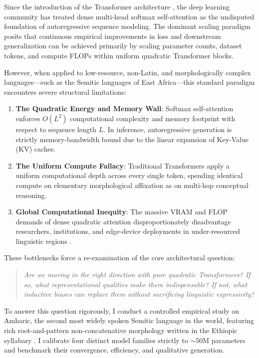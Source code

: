 \documentclass[11pt,a4paper]{article}
\begin{document}
Since the introduction of the Transformer architecture \cite{vaswani2017attention}, the deep learning community has treated dense multi-head softmax self-attention as the undisputed foundation of autoregressive sequence modeling. The dominant scaling paradigm \cite{kaplan2020scaling} posits that continuous empirical improvements in loss and downstream generalization can be achieved primarily by scaling parameter counts, dataset tokens, and compute FLOPs within uniform quadratic Transformer blocks.

However, when applied to low-resource, non-Latin, and morphologically complex languages---such as the Semitic languages of East Africa---this standard paradigm encounters severe structural limitations:
\begin{enumerate}
    \item \textbf{The Quadratic Energy and Memory Wall}: Softmax self-attention enforces $O(L^2)$ computational complexity and memory footprint with respect to sequence length $L$. In inference, autoregressive generation is strictly memory-bandwidth bound due to the linear expansion of Key-Value (KV) caches.
    \item \textbf{The Uniform Compute Fallacy}: Traditional Transformers apply a uniform computational depth across every single token, spending identical compute on elementary morphological affixation as on multi-hop conceptual reasoning.
    \item \textbf{Global Computational Inequity}: The massive VRAM and FLOP demands of dense quadratic attention disproportionately disadvantage researchers, institutions, and edge-device deployments in under-resourced linguistic regions \cite{joshi2020state}.
\end{enumerate}

These bottlenecks force a re-examination of the core architectural question:
\begin{quote}
\textit{Are we moving in the right direction with pure quadratic Transformers? If so, what representational qualities make them indispensable? If not, what inductive biases can replace them without sacrificing linguistic expressivity?}
\end{quote}

To answer this question rigorously, I conduct a controlled empirical study on Amharic, the second most widely spoken Semitic language in the world, featuring rich root-and-pattern non-concatenative morphology written in the Ethiopic syllabary \cite{bender1976language}. I calibrate four distinct model families strictly to $\sim 50\text{M}$ parameters and benchmark their convergence, efficiency, and qualitative generation.
\end{document}
